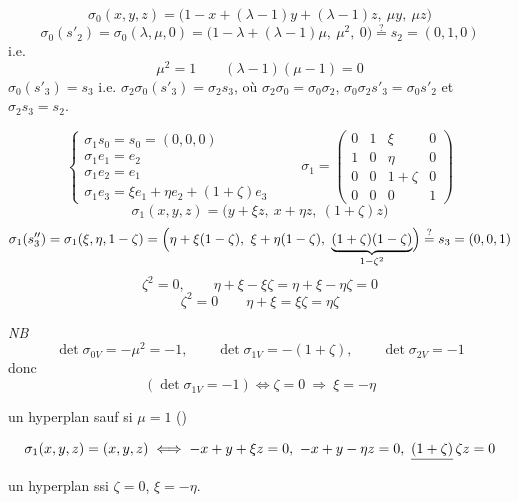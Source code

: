 \documentclass[11pt,a4paper]{article}
\begin{document}
\[
\boxed{\sigma_0(x,y,z) = \bigl(1 - x + (\lambda-1)y + (\lambda-1)z,\ \mu y,\ \mu z\bigr)}
\]
\[
\sigma_0(s'_2) = \sigma_0(\lambda,\mu,0) = \bigl(1-\lambda+(\lambda-1)\mu,\ \mu^2,\ 0\bigr) \overset{?}{=} s_2 = (0,1,0)
\]
i.e.
\[
\boxed{\mu^2 = 1 \qquad (\lambda-1)(\mu-1) = 0}
\]
$\sigma_0(s'_3) = s_3$ i.e. $\sigma_2\sigma_0(s'_3) = \sigma_2 s_3$, où $\sigma_2\sigma_0 = \sigma_0\sigma_2$, $\sigma_0\sigma_2 s'_3 = \sigma_0 s'_2$ et $\sigma_2 s_3 = s_2$.

\[
\begin{cases}
\sigma_1 s_0 = s_0 = (0,0,0) \\
\sigma_1 e_1 = e_2 \\
\sigma_1 e_2 = e_1 \\
\sigma_1 e_3 = \xi e_1 + \eta e_2 + (1+\zeta)e_3
\end{cases}
\qquad
\sigma_1 = \begin{pmatrix}
0 & 1 & \xi & 0 \\
1 & 0 & \eta & 0 \\
0 & 0 & 1+\zeta & 0 \\
0 & 0 & 0 & 1
\end{pmatrix}
\]
\[
\boxed{\sigma_1(x,y,z) = \bigl(y + \xi z,\ x + \eta z,\ (1+\zeta)z\bigr)}
\]
\[
\sigma_1(s''_3) = \sigma_1(\xi, \eta, 1-\zeta) = \Bigl(\eta + \xi(1-\zeta),\ \xi + \eta(1-\zeta),\ \underbrace{(1+\zeta)(1-\zeta)}_{1-\zeta^2}\Bigr)
\overset{?}{=} s_3 = (0,0,1)
\]
\[
\zeta^2 = 0, \qquad \eta + \xi - \xi\zeta = \eta + \xi - \eta\zeta = 0
\]
\[
\boxed{\zeta^2 = 0 \qquad \eta + \xi = \xi\zeta = \eta\zeta}
\]

\emph{NB}
\[
\det\sigma_{0V} = -\mu^2 = -1, \qquad
\det\sigma_{1V} = -(1+\zeta), \qquad
\det\sigma_{2V} = -1
\]
donc
\[
\boxed{(\det\sigma_{1V} = -1) \iff \zeta = 0} \ \Longrightarrow\ \xi = -\eta
\]

\struck{\ill{}}  un hyperplan sauf si $\mu = 1$ ()

\[
\sigma_1(x,y,z) = (x,y,z) \iff -x + y + \xi z = 0,\ -x + y - \eta z = 0,\ \struck{(1+\zeta)}\,\zeta z = 0
\]
\struck{\ill{}}  un hyperplan ssi $\zeta = 0$, $\xi = -\eta$.
\end{document}
